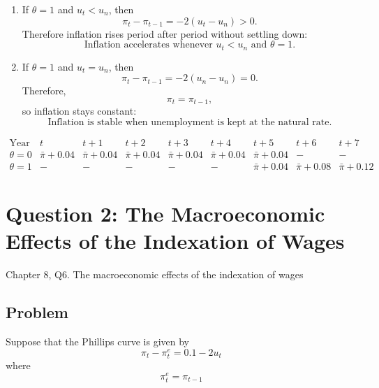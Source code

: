 \documentclass[12pt]{article}
\begin{document}
\begin{enumerate}[label=(\alph*)]
    Using \(\pi_{t+5}=\bar{\pi}+0.04\),
    \[
    \pi_{t+6}=\pi_{t+5}+0.04=\bar{\pi}+0.08,
    \]
    \[
    \pi_{t+7}=\pi_{t+6}+0.04=\bar{\pi}+0.12,
    \]
    \[
    \pi_{t+8}=\pi_{t+7}+0.04=\bar{\pi}+0.16.
    \]

    Hence,
    \[
    \boxed{\pi_{t+6}=\bar{\pi}+0.08,\qquad \pi_{t+7}=\bar{\pi}+0.12,\qquad \pi_{t+8}=\bar{\pi}+0.16.}
    \]

    \item
    If \(\theta=1\) and \(u_t<u_n\), then
    \[
    \pi_t-\pi_{t-1}=-2(u_t-u_n)>0.
    \]
    Therefore inflation rises period after period without settling down:
    \[
    \boxed{\text{Inflation accelerates whenever }u_t<u_n\text{ and }\theta=1.}
    \]

    \item
    If \(\theta=1\) and \(u_t=u_n\), then
    \[
    \pi_t-\pi_{t-1}=-2(u_n-u_n)=0.
    \]
    Therefore,
    \[
    \boxed{\pi_t=\pi_{t-1},}
    \]
    so inflation stays constant:
    \[
    \boxed{\text{Inflation is stable when unemployment is kept at the natural rate.}}
    \]
\end{enumerate}

\begin{center}
\[
\begin{array}{c|cccccccc}
\text{Year} & t & t+1 & t+2 & t+3 & t+4 & t+5 & t+6 & t+7 \\ \hline
\theta=0 & \bar{\pi}+0.04 & \bar{\pi}+0.04 & \bar{\pi}+0.04 & \bar{\pi}+0.04 & \bar{\pi}+0.04 & \bar{\pi}+0.04 & - & - \\
\theta=1 & - & - & - & - & - & \bar{\pi}+0.04 & \bar{\pi}+0.08 & \bar{\pi}+0.12
\end{array}
\]
\end{center}

\newpage
\section{Question 2: The Macroeconomic Effects of the Indexation of Wages}

\noindent
Chapter 8, Q6. The macroeconomic effects of the indexation of wages

\subsection{Problem}
Suppose that the Phillips curve is given by
\begin{equation}
\pi_t-\pi_t^e=0.1-2u_t \tag{1}
\end{equation}
where
\begin{equation}
\pi_t^e=\pi_{t-1} \tag{2}
\end{equation}
\end{document}
